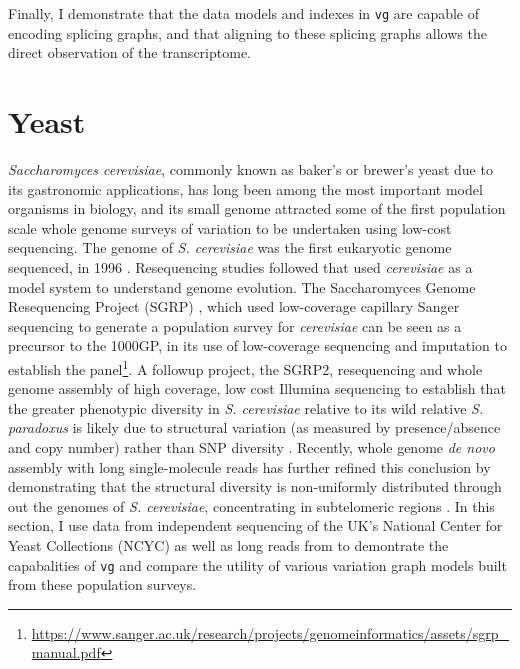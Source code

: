 Finally, I demonstrate that the data models and indexes in {\tt vg} are capable of encoding splicing graphs, and that aligning to these splicing graphs allows the direct observation of the transcriptome.

\section{Yeast}

\emph{Saccharomyces cerevisiae}, commonly known as baker's or brewer's yeast due to its gastronomic applications, has long been among the most important model organisms in biology, and its small genome attracted some of the first population scale whole genome surveys of variation to be undertaken using low-cost sequencing.
The genome of \emph{S. cerevisiae} was the first eukaryotic genome sequenced, in 1996 \cite{goffeau1996life}.
Resequencing studies followed that used \emph{cerevisiae} as a model system to understand genome evolution.
The Saccharomyces Genome Resequencing Project (SGRP) \cite{litisgrp}, which used low-coverage capillary Sanger sequencing to generate a population survey for \emph{cerevisiae} can be seen as a precursor to the 1000GP, in its use of low-coverage sequencing and imputation to establish the panel\footnote{\url{https://www.sanger.ac.uk/research/projects/genomeinformatics/assets/sgrp_manual.pdf}}.
A followup project, the SGRP2, resequencing and whole genome assembly of high coverage, low cost Illumina sequencing to establish that the greater phenotypic diversity in \emph{S. cerevisiae} relative to its wild relative \emph{S. paradoxus} is likely due to structural variation (as measured by presence/absence and copy number) rather than SNP diversity \cite{bergstrom2014high}.
Recently, whole genome \emph{de novo} assembly with long single-molecule reads has further refined this conclusion by demonstrating that the structural diversity is non-uniformly distributed through out the genomes of \emph{S. cerevisiae}, concentrating in subtelomeric regions \cite{yue2017contrasting}.
In this section, I use data from independent sequencing of the UK's National Center for Yeast Collections (NCYC) as well as long reads from \cite{yue2017contrasting} to demontrate the capabalities of {\tt vg} and compare the utility of various variation graph models built from these population surveys.

